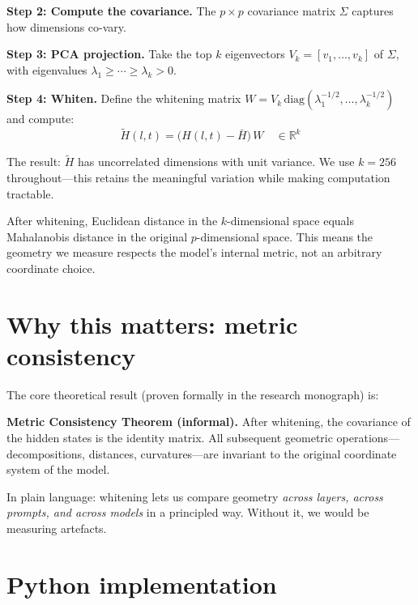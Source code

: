 \documentclass[11pt, twoside, openright]{memoir}
\begin{document}
\textbf{Step 2: Compute the covariance.} The $p \times p$ covariance matrix
$\Sigma$ captures how dimensions co-vary.

\textbf{Step 3: PCA projection.} Take the top $k$ eigenvectors
$V_k = [v_1, \ldots, v_k]$ of $\Sigma$, with eigenvalues
$\lambda_1 \geq \cdots \geq \lambda_k > 0$.

\textbf{Step 4: Whiten.} Define the whitening matrix
$W = V_k \,\text{diag}(\lambda_1^{-1/2}, \ldots, \lambda_k^{-1/2})$
and compute:
\[
  \widetilde{H}(l,t) = \bigl(H(l,t) - \bar{H}\bigr) \, W
  \quad \in \mathbb{R}^k
\]

The result: $\widetilde{H}$ has uncorrelated dimensions with unit variance.
We use $k = 256$ throughout---this retains the meaningful variation while
making computation tractable.

\begin{keyidea}
After whitening, Euclidean distance in the $k$-dimensional space equals
Mahalanobis distance in the original $p$-dimensional space. This means the
geometry we measure respects the model's internal metric, not an arbitrary
coordinate choice.
\end{keyidea}

\section{Why this matters: metric consistency}

The core theoretical result (proven formally in the research monograph) is:

\begin{tcolorbox}[base, colback=LGreen, colframe=DGreen]
\textbf{Metric Consistency Theorem (informal).}
After whitening, the covariance of the hidden states is the identity matrix.
All subsequent geometric operations---decompositions, distances,
curvatures---are invariant to the original coordinate system of the model.
\end{tcolorbox}

In plain language: whitening lets us compare geometry \emph{across layers,
across prompts, and across models} in a principled way. Without it, we would
be measuring artefacts.

\section{Python implementation}
\end{document}
